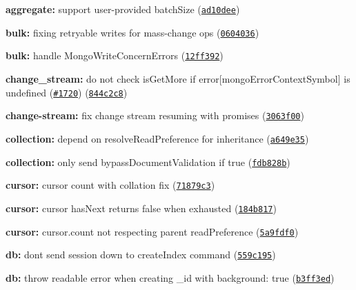 \begin{DoxyItemize}
\item {\bfseries aggregate\+:} support user-\/provided {\ttfamily batch\+Size} (\href{https://github.com/mongodb/node-mongodb-native/commit/ad10dee}{\tt ad10dee})
\item {\bfseries bulk\+:} fixing retryable writes for mass-\/change ops (\href{https://github.com/mongodb/node-mongodb-native/commit/0604036}{\tt 0604036})
\item {\bfseries bulk\+:} handle Mongo\+Write\+Concern\+Errors (\href{https://github.com/mongodb/node-mongodb-native/commit/12ff392}{\tt 12ff392})
\item {\bfseries change\+\_\+stream\+:} do not check is\+Get\+More if error\mbox{[}mongo\+Error\+Context\+Symbol\mbox{]} is undefined (\href{https://github.com/mongodb/node-mongodb-native/issues/1720}{\tt \#1720}) (\href{https://github.com/mongodb/node-mongodb-native/commit/844c2c8}{\tt 844c2c8})
\item {\bfseries change-\/stream\+:} fix change stream resuming with promises (\href{https://github.com/mongodb/node-mongodb-native/commit/3063f00}{\tt 3063f00})
\item {\bfseries collection\+:} depend on {\ttfamily resolve\+Read\+Preference} for inheritance (\href{https://github.com/mongodb/node-mongodb-native/commit/a649e35}{\tt a649e35})
\item {\bfseries collection\+:} only send bypass\+Document\+Validation if true (\href{https://github.com/mongodb/node-mongodb-native/commit/fdb828b}{\tt fdb828b})
\item {\bfseries cursor\+:} cursor count with collation fix (\href{https://github.com/mongodb/node-mongodb-native/commit/71879c3}{\tt 71879c3})
\item {\bfseries cursor\+:} cursor has\+Next returns false when exhausted (\href{https://github.com/mongodb/node-mongodb-native/commit/184b817}{\tt 184b817})
\item {\bfseries cursor\+:} cursor.\+count not respecting parent read\+Preference (\href{https://github.com/mongodb/node-mongodb-native/commit/5a9fdf0}{\tt 5a9fdf0})
\item {\bfseries db\+:} don\textquotesingle{}t send session down to create\+Index command (\href{https://github.com/mongodb/node-mongodb-native/commit/559c195}{\tt 559c195})
\item {\bfseries db\+:} throw readable error when creating {\ttfamily \+\_\+id} with background\+: true (\href{https://github.com/mongodb/node-mongodb-native/commit/b3ff3ed}{\tt b3ff3ed})

\end{DoxyItemize}
